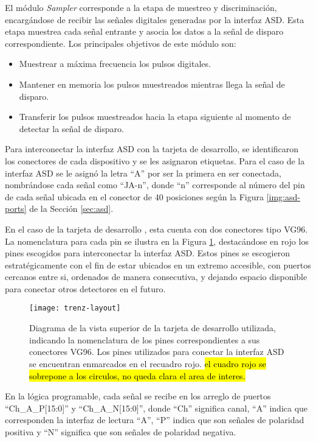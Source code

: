 	El módulo \textit{Sampler} corresponde a la etapa de muestreo y discriminación, encargándose de recibir las señales digitales generadas por la interfaz ASD. Esta etapa muestrea cada señal entrante y asocia los datos a la señal de disparo correspondiente. Los principales objetivos de este módulo son:
	
	\begin{itemize}
		\item Muestrear a máxima frecuencia  los pulsos digitales.
		\item Mantener en memoria los pulsos muestreados mientras llega la señal de disparo.
		\item Transferir los pulsos muestreados hacia la etapa siguiente al momento de detectar la señal de disparo.
	\end{itemize}

	Para interconectar la interfaz ASD con la tarjeta de desarrollo, se identificaron los conectores de cada dispositivo y se les asignaron etiquetas. Para el caso de la interfaz ASD se le asignó la letra ``A'' por ser la primera en ser conectada, nombrándose cada señal como ``JA-n'', donde ``n'' corresponde al número del pin de cada señal ubicada en el conector de 40 posiciones según la Figura \ref{img:asd-ports} de la Sección \ref{sec:asd}.
	
	En el caso de la tarjeta de desarrollo , esta cuenta con dos conectores tipo VG96. La nomenclatura para cada pin se ilustra en la Figura \ref{fig:trenz-layout}, destacándose en rojo los pines escogidos para interconectar la interfaz ASD. Estos pines se escogieron estratégicamente con el fin de estar ubicados en un extremo accesible, con puertos cercanos entre si, ordenados de manera consecutiva, y dejando espacio disponible para conectar otros detectores en el futuro.
	
	\begin{figure}[H]
		\centering
		\texttt{[image: trenz-layout]}
		\caption{Diagrama de la vista superior de la tarjeta de desarrollo utilizada, indicando la nomenclatura de los pines correspondientes a sus conectores VG96. Los pines utilizados para conectar la interfaz ASD se encuentran enmarcados en el recuadro rojo. \hl{el cuadro rojo se sobrepone a los circulos, no queda clara el area de interes.}}
		\label{fig:trenz-layout}
	\end{figure}
	
	En la lógica programable, cada señal se recibe en los arreglo de puertos ``Ch\_A\_P[15:0]'' y ``Ch\_A\_N[15:0]'', donde ``Ch'' significa canal, ``A'' indica que corresponden la interfaz de lectura ``A'', ``P'' indica que son señales de polaridad positiva y ``N'' significa que son señales de polaridad negativa.
	
